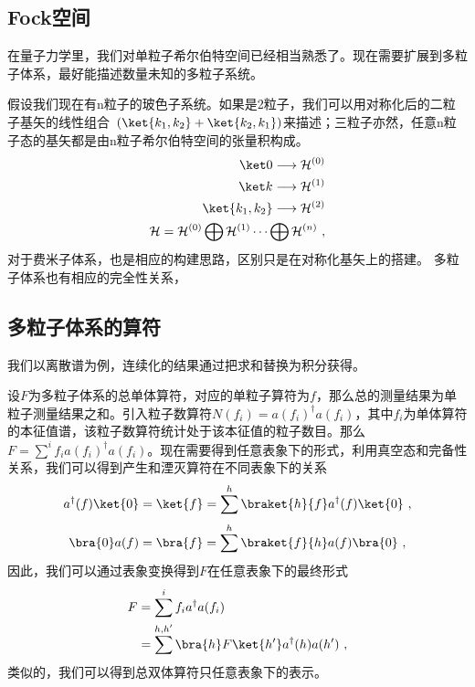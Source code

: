 \subsection{Fock空间}
在量子力学里，我们对单粒子希尔伯特空间已经相当熟悉了。现在需要扩展到多粒子体系，最好能描述数量未知的多粒子系统。

假设我们现在有n粒子的玻色子系统。如果是2粒子，我们可以用对称化后的二粒子基矢的线性组合~$(\ket {k_1,k_2}+\ket {k_2,k_1})$来描述；三粒子亦然，任意n粒子态的基矢都是由n粒子希尔伯特空间的张量积构成。
\begin{align}
\ket 0 \longrightarrow \mathcal{H}^{(0)} \\
\ket k \longrightarrow \mathcal{H}^{(1)} \\
\ket {k_1,k_2}\longrightarrow \mathcal{H}^{(2)}\\
\mathcal{H}=\mathcal{H}^{(0)} \bigoplus \mathcal{H}^{(1)} \cdots \bigoplus \mathcal{H}^{(n)}~,
\end{align}
对于费米子体系，也是相应的构建思路，区别只是在对称化基矢上的搭建。
多粒子体系也有相应的完全性关系，

\subsection{多粒子体系的算符}
我们以离散谱为例，连续化的结果通过把求和替换为积分获得。

设$ F$为多粒子体系的总单体算符，对应的单粒子算符为$f$，那么总的测量结果为单粒子测量结果之和。引入粒子数算符$N(f_i)=a(f_i)^\dagger a(f_i)$，其中${f_i}$为单体算符的本征值谱，该粒子数算符统计处于该本征值的粒子数目。那么$F=\sum ^i f_i a(f_i)^\dagger a(f_i) $。现在需要得到任意表象下的形式，利用真空态和完备性关系，我们可以得到产生和湮灭算符在不同表象下的关系
\begin{equation}
a^{\dagger}(f)\ket{0}=\ket{f}=\sum ^{h}\braket{h}{f}a^{\dagger}(f)\ket{0}~,
\end{equation}
\begin{equation}
\bra{0}a(f)=\bra{f}=\sum^{h}\braket{f}{h}a(f)\bra{0}~,
\end{equation}
因此，我们可以通过表象变换得到$F$在任意表象下的最终形式
\begin{equation}
\begin{aligned}
F&=\sum^i f_i a^\dagger a(f_i)\\
&=\sum^{h,h'}\bra{h}F\ket{h'}a^\dagger(h)a(h')~,
\end{aligned}
\end{equation}
类似的，我们可以得到总双体算符只任意表象下的表示。

